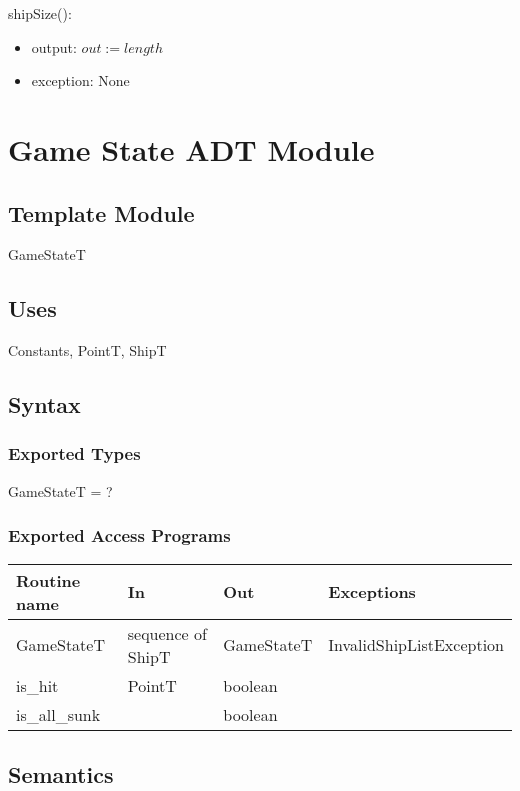 \documentclass[12pt]{article}
\begin{document}
\noindent shipSize():
\begin{itemize}
\item output: $out := length$
\item exception: None
\end{itemize}

\newpage

\section* {Game State ADT Module}

\subsection* {Template Module}

GameStateT

\subsection* {Uses}

Constants, PointT, ShipT

\subsection* {Syntax}

\subsubsection* {Exported Types}
GameStateT = ?

\subsubsection* {Exported Access Programs}

\begin{tabular}{| l | l | l | p{5cm} |}
\hline
\textbf{Routine name} & \textbf{In} & \textbf{Out} & \textbf{Exceptions}\\
\hline
GameStateT & sequence of ShipT & GameStateT & InvalidShipListException\\
\hline
is\_hit & PointT & boolean & ~\\
\hline
is\_all\_sunk & ~ & boolean & ~\\
\hline

\end{tabular}

\subsection* {Semantics}
\end{document}
